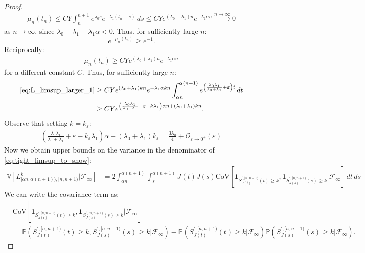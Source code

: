 \documentclass{article}
\numberwithin{equation}{section}
\begin{document}
\begin{proof}
\begin{align*}
    \mu_n(t_n)\leq CY\int_n^{n+1}e^{\lambda_0 s}e^{-\lambda_1(t_n-s)}\,ds\leq CYe^{(\lambda_0+\lambda_1) n}e^{-\lambda_1\alpha n}\overset{n\to\infty}{\to}0
\end{align*}
as $n\to\infty$, since $\lambda_0+\lambda_1-\lambda_1\alpha<0$. Thus. for sufficiently large $n$:
\[e^{-\mu_n(t_n)}\geq e^{-1}.\]
Reciprocally:
\begin{align*}
    \mu_n(t_n)\geq CYe^{(\lambda_0+\lambda_1)n}e^{-\lambda_1\alpha n}
\end{align*}
for a different constant $C$. Thus, for sufficiently large $n$:
\begin{align*}
    \ref{eq:L_limsup_larger_1}&\geq CYe^{(\lambda_0+\lambda_1)kn}e^{-\lambda_1\alpha kn}\int_{\alpha n}^{\alpha(n+1)}e^{\left(\frac{\lambda_0\lambda_1}{\lambda_0+\lambda_1}+\varepsilon\right)t}\,dt\\
    &\geq CY e^{\left(\frac{\lambda_0\lambda_1}{\lambda_0+\lambda_1}+\varepsilon-k\lambda_1\right)\alpha n+(\lambda_0+\lambda_1)kn}.
\end{align*}
  Observe that setting $k=k_\varepsilon$:
  \begin{align}
    \left(\frac{\lambda_0\lambda_1}{\lambda_0+\lambda_1}+\varepsilon-k_\varepsilon\lambda_1\right)\alpha +(\lambda_0+\lambda_1)k_\varepsilon=\frac{3\lambda_0}{4}+\mathcal{O}_{\varepsilon\to 0^+}(\varepsilon)\label{eq:exp_minimum_growth}
  \end{align}
  Now we obtain upper bounds on the variance in the denominator of \ref{eq:tight_limsup_to_show}:
  \begin{align}
    \mathbb{V}\left[L_{[\alpha n,\alpha (n+1)),[n,n+1)}^k|\mathcal{F}_\infty\right]&=2\int_{\alpha n}^{\alpha(n+1)}\int_{s}^{\alpha(n+1)}J(t)J(s)\text{CoV}[\mathbf{1}_{S_{J(t)}^{',[n,n+1)}(t)\geq k},\mathbf{1}_{S_{J(s)}^{',[n,n+1)}(s)\geq k}|\mathcal{F}_\infty]\,dt\,ds\label{eq:variance_term_limsup}
  \end{align}
  We can write the covariance term as:
  \begin{align}
    &\text{CoV}[\mathbf{1}_{S_{J(t)}^{',[n,n+1)}(t)\geq k},\mathbf{1}_{S_{J(s)}^{',[n,n+1)}(s)\geq k}|\mathcal{F}_\infty]\nonumber\\
    &=\mathbb{P}\left(S_{J(t)}^{',[n,n+1)}(t)\geq k,S_{J(s)}^{',[n,n+1)}(s)\geq k|\mathcal{F}_\infty\right)-\mathbb{P}\left(S_{J(t)}^{',[n,n+1)}(t)\geq k|\mathcal{F}_\infty\right)\mathbb{P}\left(S_{J(s)}^{',[n,n+1)}(s)\geq k|\mathcal{F}_\infty\right).\label{eq:cov_decomposition}
  \end{align}

\end{proof}
\end{document}
